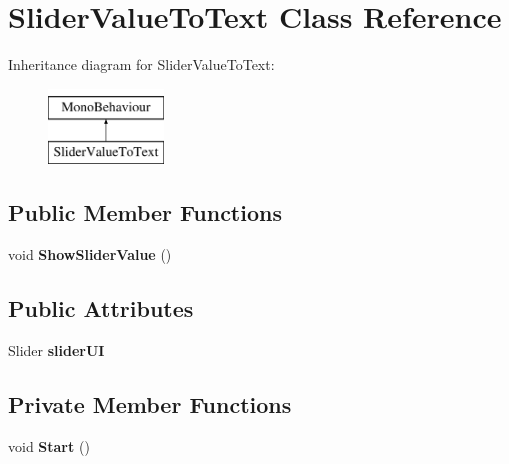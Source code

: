 \hypertarget{class_slider_value_to_text}{}\section{Slider\+Value\+To\+Text Class Reference}
\label{class_slider_value_to_text}
Inheritance diagram for Slider\+Value\+To\+Text\+:\begin{figure}[H]
\begin{center}
\leavevmode
\includegraphics[height=2.000000cm]{class_slider_value_to_text}
\end{center}
\end{figure}
\subsection*{Public Member Functions}
\begin{DoxyCompactItemize}
\item 
\mbox{\label{class_slider_value_to_text_a1e93d17620fd0bea495869b42ebd5ac4}} 
void {\bfseries Show\+Slider\+Value} ()
\end{DoxyCompactItemize}
\subsection*{Public Attributes}
\begin{DoxyCompactItemize}
\item 
\mbox{\label{class_slider_value_to_text_a9ae7274884f2df48ffcdb85ffc33317e}} 
Slider {\bfseries slider\+UI}
\end{DoxyCompactItemize}
\subsection*{Private Member Functions}
\begin{DoxyCompactItemize}
\item 
\mbox{\label{class_slider_value_to_text_a5a1ccc256f2a2e0d0b3bdccf6e3b6feb}} 
void {\bfseries Start} ()
\end{DoxyCompactItemize}
